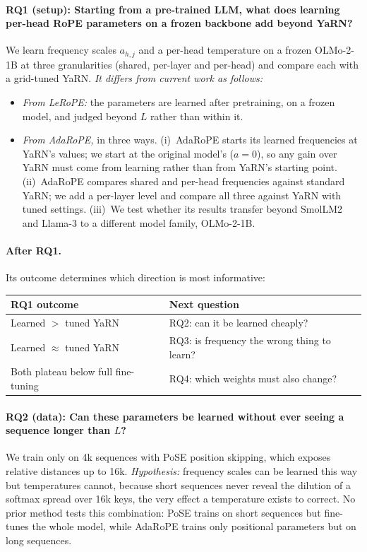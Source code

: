 \documentclass[11pt]{article}
\begin{document}
\paragraph{RQ1 (setup): Starting from a pre-trained LLM, what does learning per-head RoPE parameters on a frozen backbone add beyond YaRN?}
We learn frequency scales $a_{h,j}$ and a per-head temperature on a frozen OLMo-2-1B at three granularities (shared, per-layer and per-head) and compare each with a grid-tuned YaRN. \emph{It differs from current work as follows:}
\begin{itemize}
  \item \emph{From LeRoPE:} the parameters are learned after pretraining, on a frozen model, and judged beyond $L$ rather than within it.
 \item \emph{From AdaRoPE,} in three ways. (i)~AdaRoPE starts its learned frequencies at YaRN's values; we start at the original model's ($a=0$), so any gain over YaRN must come from learning rather than from YaRN's starting point. (ii)~AdaRoPE compares shared and per-head frequencies against standard YaRN; we add a per-layer level and compare all three against YaRN with tuned settings. (iii)~We test whether its results transfer beyond SmolLM2 and Llama-3 to a different model family, OLMo-2-1B.
\end{itemize}
\paragraph{After RQ1.} Its outcome determines which direction is most informative:\vspace{2pt}

\begin{tabular}{@{}>{\raggedright\arraybackslash}p{}>{\raggedright\arraybackslash}p{}@{}}
\toprule
\textbf{RQ1 outcome} & \textbf{Next question} \\
\midrule
Learned $>$ tuned YaRN & RQ2: can it be learned cheaply? \\
Learned $\approx$ tuned YaRN & RQ3: is frequency the wrong thing to learn? \\
Both plateau below full fine-tuning & RQ4: which weights must also change? \\
\bottomrule
\end{tabular}

\paragraph{RQ2 (data): Can these parameters be learned without ever seeing a sequence longer than $L$?}
We train only on 4k sequences with PoSE position skipping, which exposes relative distances up to 16k. \emph{Hypothesis:} frequency scales can be learned this way but temperatures cannot, because short sequences never reveal the dilution of a softmax spread over 16k keys, the very effect a temperature exists to correct. No prior method tests this combination: PoSE trains on short sequences but fine-tunes the whole model, while AdaRoPE trains only positional parameters but on long sequences.
\end{document}
